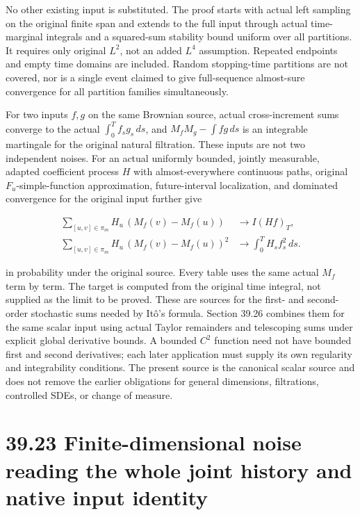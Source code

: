 \documentclass[
  english,
  11pt,
  oneside]{book}
\begin{document}
No other existing input is substituted. The proof starts with actual left sampling on the original finite span and extends to the full input through actual time-marginal integrals and a squared-sum stability bound uniform over all partitions. It requires only original \(L^2\), not an added \(L^4\) assumption. Repeated endpoints and empty time domains are included. Random stopping-time partitions are not covered, nor is a single event claimed to give full-sequence almost-sure convergence for all partition families simultaneously.

For two inputs \(f,g\) on the same Brownian source, actual cross-increment sums converge to the actual \(\int_0^T f_sg_s\,ds\), and \(M_fM_g-\int fg\,ds\) is an integrable martingale for the original natural filtration. These inputs are not two independent noises. For an actual uniformly bounded, jointly measurable, adapted coefficient process \(H\) with almost-everywhere continuous paths, original \(F_u\)-simple-function approximation, future-interval localization, and dominated convergence for the original input further give

\[\begin{aligned}
\sum_{[u,v]\in\pi_m}H_u\,(M_f(v)-M_f(u)) &\longrightarrow I(Hf)_T,\\
\sum_{[u,v]\in\pi_m}H_u\,(M_f(v)-M_f(u))^2 &\longrightarrow \int_0^T H_sf_s^2\,ds.
\end{aligned}\]

in probability under the original source. Every table uses the same actual \(M_f\) term by term. The target is computed from the original time integral, not supplied as the limit to be proved. These are sources for the first- and second-order stochastic sums needed by Itô's formula. Section 39.26 combines them for the same scalar input using actual Taylor remainders and telescoping sums under explicit global derivative bounds. A bounded \(C^2\) function need not have bounded first and second derivatives; each later application must supply its own regularity and integrability conditions. The present source is the canonical scalar source and does not remove the earlier obligations for general dimensions, filtrations, controlled SDEs, or change of measure.

\section{39.23 Finite-dimensional noise reading the whole joint history and native input identity}\label{finite-dimensional-noise-reading-the-whole-joint-history-and-native-input-identity}
\end{document}
